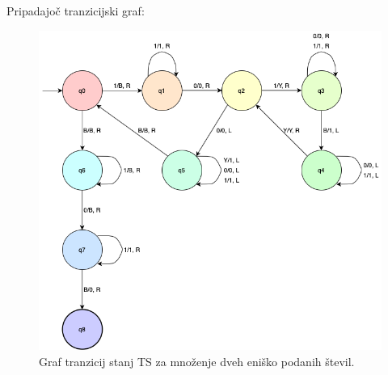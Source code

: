 \documentclass[a4paper,11pt]{article}
\begin{document}
\noindent
Pripadajoč tranzicijski graf:
\begin{figure}[ht!]
    \centering
    \includegraphics[width=150mm]{graf.png}
    \caption{Graf tranzicij stanj TS za množenje dveh eniško podanih števil.}
\end{figure}
\end{document}
